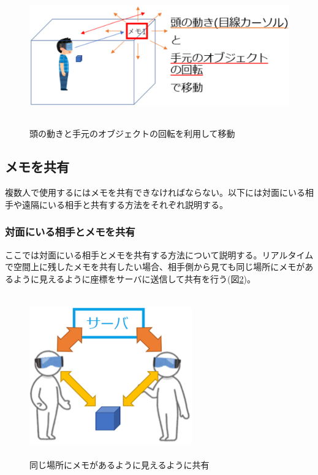\documentclass[11pt,a4j, titlepage]{jarticle} %
\begin{document}
\begin{figure}[H]
  \begin{center}
    \includegraphics[clip,height=6.0cm,width=13.0cm]{./3d_fishing4.eps}
    \caption{頭の動きと手元のオブジェクトの回転を利用して移動}
    \label{fig:3d_fishing4}
  \end{center}
\end{figure}


\subsection{メモを共有}
複数人で使用するにはメモを共有できなければならない。以下には対面にいる相手や遠隔にいる相手と共有する方法をそれぞれ説明する。

\subsubsection{対面にいる相手とメモを共有}
ここでは対面にいる相手とメモを共有する方法について説明する。リアルタイムで空間上に残したメモを共有したい場合、相手側から見ても同じ場所にメモがあるように見えるように座標をサーバに送信して共有を行う(図\ref{fig:sharing_taimen})。

\begin{figure}[H]
  \begin{center}
    \includegraphics[clip,height=7.0cm,width=7.0cm]{./sharing_taimen.eps}
    \caption{同じ場所にメモがあるように見えるように共有}
    \label{fig:sharing_taimen}
  \end{center}
\end{figure}
\end{document}
